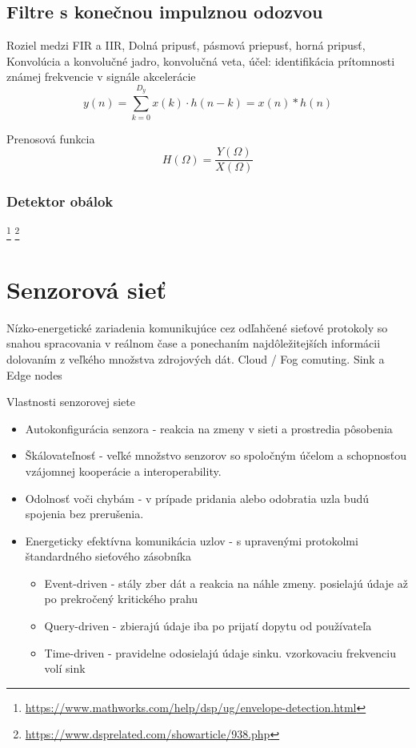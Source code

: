 \subsection{Filtre s konečnou impulznou odozvou}
\label{fir-filter}
Roziel medzi FIR a IIR, Dolná pripusť, pásmová priepusť, horná pripusť,
 Konvolúcia a konvolučné jadro, konvolučná veta, účel: identifikácia prítomnosti známej frekvencie v signále akcelerácie
\begin{equation}
y(n) = \sum_{k=0}^{D_y}{x(k) \cdot h(n-k)} = x(n) * h(n)
\end{equation}

Prenosová funkcia
\begin{equation}
H(\Omega) = \frac{Y(\Omega)}{X(\Omega)}
\end{equation}

\subsubsection{Detektor obálok}
\footnote{\url{https://www.mathworks.com/help/dsp/ug/envelope-detection.html}}
\footnote{\url{https://www.dsprelated.com/showarticle/938.php}}

\section{Senzorová sieť}
Nízko-energetické zariadenia komunikujúce cez odľahčené sieťové protokoly so snahou spracovania v reálnom čase a ponechaním najdôležitejších informácii dolovaním z veľkého množstva zdrojových dát. Cloud / Fog comuting. Sink a Edge nodes

Vlastnosti senzorovej siete
\begin{itemize}
\itemsep0em
\item Autokonfigurácia senzora - reakcia na zmeny v sieti a prostredia pôsobenia
\item Škálovateľnosť - veľké množstvo senzorov so spoločným účelom a schopnosťou vzájomnej kooperácie a interoperability.
\item Odolnosť voči chybám - v prípade pridania alebo odobratia uzla budú spojenia bez prerušenia.
\item Energeticky efektívna komunikácia uzlov - s upravenými protokolmi štandardného sieťového zásobníka
\begin{itemize}
\itemsep0em
\item Event-driven - stály zber dát a reakcia na náhle zmeny. posielajú údaje až po prekročený kritického prahu
\item Query-driven - zbierajú údaje iba po prijatí dopytu od používateľa
\item Time-driven - pravidelne odosielajú údaje sinku. vzorkovaciu frekvenciu volí sink
\end{itemize}
\end{itemize}
\cite{wsn-overview}

